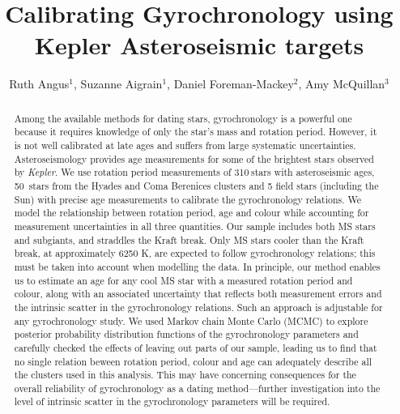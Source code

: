 \documentclass[11pt,preprint]{aastex}
\newcommand{\nastero}{310}
\newcommand{\nHC}{50~}
\begin{document}
\title{Calibrating Gyrochronology using Kepler Asteroseismic targets}

\author{Ruth Angus$^1$, Suzanne Aigrain$^1$,
Daniel Foreman-Mackey$^2$, Amy McQuillan$^3$}

\begin{abstract}
\label{abs}

Among the available methods for dating stars, gyrochronology is a powerful one
because it requires knowledge of only the star's mass and rotation period.
However, it is not well calibrated at late ages and suffers from large
systematic uncertainties.
Asteroseismology provides age measurements for some of the brightest stars
observed by {\it Kepler}.
We use rotation period measurements of \nastero$~$stars with asteroseismic
ages, \nHC stars from the Hyades and Coma Berenices clusters and 5 field stars
(including the Sun) with precise age measurements to calibrate the
gyrochronology relations.
We model the relationship between rotation period, age and colour while
accounting for measurement uncertainties in all three quantities.
Our sample includes both MS stars and subgiants, and straddles the Kraft break.
Only MS stars cooler than the Kraft break, at approximately 6250 K, are
expected to follow gyrochronology relations; this must be taken into account
when modelling the data.
In principle, our method enables us to estimate an age for any cool MS star
with a measured rotation period and colour, along with an associated
uncertainty that reflects both measurement errors and the intrinsic scatter in
the gyrochronology relations.
Such an approach is adjustable for any gyrochronology study.
We used Markov chain Monte Carlo (MCMC) to explore posterior probability
distribution functions of the gyrochronology parameters and carefully checked
the effects of leaving out parts of our sample, leading us to find that no
single relation beween rotation period, colour and age can adequately describe
all the clusters used in this analysis.
This may have concerning consequences for the overall reliability of
gyrochronology as a dating method---further investigation into the level of
intrinsic scatter in the gyrochronology parameters will be required.

\end{abstract}
\end{document}
